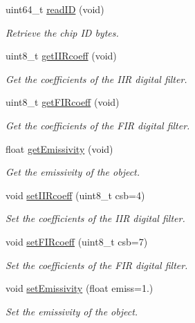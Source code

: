 \begin{DoxyCompactItemize}
\item 
uint64\-\_\-t \hyperlink{class_m_l_x90614_a352cc543f3e417d6318b6152d872db2e}{read\-I\-D} (void)
\begin{DoxyCompactList}\small\item\em Retrieve the chip I\-D bytes. \end{DoxyCompactList}\item 
uint8\-\_\-t \hyperlink{class_m_l_x90614_ac04578d67760dd73df4ed023d9b97896}{get\-I\-I\-Rcoeff} (void)
\begin{DoxyCompactList}\small\item\em Get the coefficients of the I\-I\-R digital filter. \end{DoxyCompactList}\item 
uint8\-\_\-t \hyperlink{class_m_l_x90614_a8b50c1957a50c7dda5767fe881a7fa95}{get\-F\-I\-Rcoeff} (void)
\begin{DoxyCompactList}\small\item\em Get the coefficients of the F\-I\-R digital filter. \end{DoxyCompactList}\item 
float \hyperlink{class_m_l_x90614_a44234371f1e9dd36781898d0c87fdbbf}{get\-Emissivity} (void)
\begin{DoxyCompactList}\small\item\em Get the emissivity of the object. \end{DoxyCompactList}\item 
void \hyperlink{class_m_l_x90614_af62b9d897164375e8c17fb5a8d367600}{set\-I\-I\-Rcoeff} (uint8\-\_\-t csb=4)
\begin{DoxyCompactList}\small\item\em Set the coefficients of the I\-I\-R digital filter. \end{DoxyCompactList}\item 
void \hyperlink{class_m_l_x90614_a3849320b7988ca5882f25fbc87dd0de7}{set\-F\-I\-Rcoeff} (uint8\-\_\-t csb=7)
\begin{DoxyCompactList}\small\item\em Set the coefficients of the F\-I\-R digital filter. \end{DoxyCompactList}\item 
void \hyperlink{class_m_l_x90614_ab7e462d10f8d26bdd55f77eb4c81a5ff}{set\-Emissivity} (float emiss=1.)
\begin{DoxyCompactList}\small\item\em Set the emissivity of the object. \end{DoxyCompactList}\item 

\end{DoxyCompactItemize}

